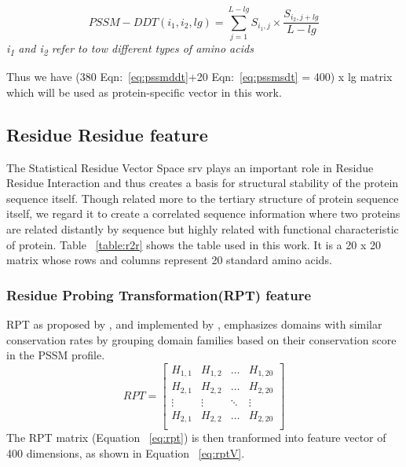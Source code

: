 \begin{equation}
  PSSM-DDT(i_1,i_2, lg) = \sum_{j=1}^{L-lg} S_{i_1,j} \times \frac{ S_{i_2,j+lg} }{ L-lg} 
  \label{eq:pssmddt}
\end{equation}
\textit{\centering i\textsubscript{1} and i\textsubscript{2} refer to tow different types of amino acids}

Thus we have (380 Eqn:~\ref{eq:pssmddt}+20 Eqn:~\ref{eq:pssmsdt} = 400) x lg matrix which will be used as protein-specific vector in this work.

\subsection{Residue Residue feature}
The Statistical Residue Vector Space \acrshort{srv} \cite{Wong2018} plays an important role in Residue Residue Interaction and thus creates a basis for structural stability of the protein sequence itself. Though related more to the tertiary structure of protein sequence itself, we regard it to create a correlated sequence information where two proteins are related distantly by sequence but highly related with functional characteristic of protein. Table ~\ref{table:r2r} shows the table used in this work. It is a 20 x 20 matrix whose rows and columns represent 20 standard amino acids.

\subsubsection{Residue Probing Transformation(RPT) feature}
RPT as proposed by \cite[{Jeong et al.}]{Jeong2011}, and implemented by \cite[Pujan et al.]{Mishra2019}, emphasizes domains with similar conservation rates by grouping domain families based on their conservation score in the PSSM profile.
\begin{equation}
  RPT = \begin{bmatrix}
    H_{1,1} & H_{1,2} & \dots & H_{1,20} \\
    H_{2,1} & H_{2,2} & \dots & H_{2,20} \\
    \vdots  & \vdots  & \ddots & \vdots \\
    H_{2,1} & H_{2,2} & \dots & H_{2,20} \\
  \end{bmatrix}
  \label{eq:rpt}
\end{equation}
The RPT matrix (Equation ~\ref{eq:rpt}) is then tranformed into feature vector of 400 dimensions, as shown in Equation ~\ref{eq:rptV}.

